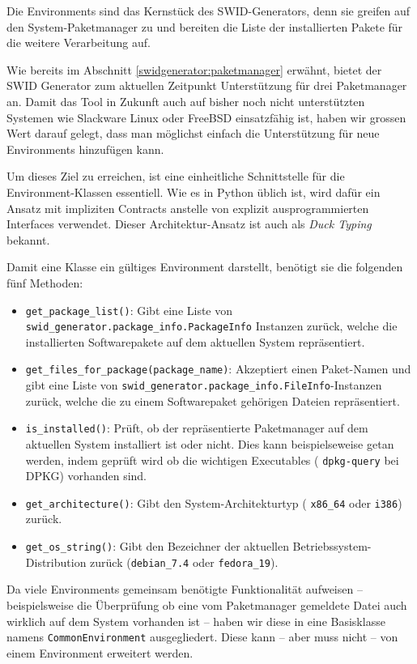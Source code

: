 Die Environments sind das Kernstück des SWID-Generators, denn sie greifen auf
den System-Paketmanager zu und bereiten die Liste der installierten Pakete für
die weitere Verarbeitung auf.

Wie bereits im Abschnitt \ref{swidgenerator:paketmanager} erwähnt, bietet der
SWID Generator zum aktuellen Zeitpunkt Unterstützung für drei Paketmanager an.
Damit das Tool in Zukunft auch auf bisher noch nicht unterstützten Systemen wie
Slackware Linux oder FreeBSD einsatzfähig ist, haben wir grossen Wert darauf
gelegt, dass man möglichst einfach die Unterstützung für neue Environments
hinzufügen kann.

Um dieses Ziel zu erreichen, ist eine einheitliche Schnittstelle für die
Environment-Klassen essentiell. Wie es in Python üblich
ist\cite{contracts:2003}, wird dafür ein Ansatz mit impliziten Contracts
anstelle von explizit ausprogrammierten Interfaces verwendet. Dieser
Architektur-Ansatz ist auch als \textit{Duck Typing} bekannt.

Damit eine Klasse ein gültiges Environment darstellt, benötigt sie die folgenden
fünf Methoden:

\begin{itemize}
	\item \texttt{get\_package\_list()}: Gibt eine Liste von
		\texttt{swid\_generator.\-package\_info.\-PackageInfo} Instanzen zurück,
		welche die installierten Softwarepakete auf dem aktuellen System
		repräsentiert.
	\item \texttt{get\_files\_for\_package(package\_name)}: Akzeptiert einen
		Paket-Namen und gibt eine Liste von
		\texttt{swid\_generator.\-package\_info.\-FileInfo}-Instanzen zurück, welche
		die zu einem Softwarepaket gehörigen Dateien repräsentiert.
	\item \texttt{is\_installed()}: Prüft, ob der repräsentierte Paketmanager auf
		dem aktuellen System installiert ist oder nicht. Dies kann beispielseweise
		getan werden, indem geprüft wird ob die wichtigen Executables (\zb
		\texttt{dpkg-query} bei DPKG) vorhanden sind.
	\item \texttt{get\_architecture()}: Gibt den System-Architekturtyp (\zb
		\texttt{x86\_64} oder \texttt{i386}) zurück.
	\item \texttt{get\_os\_string()}: Gibt den Bezeichner der aktuellen
		Betriebssystem-Distribution zurück (\zb \texttt{debian\_7.4} oder
		\texttt{fedora\_19}).
\end{itemize}

Da viele Environments gemeinsam benötigte Funktionalität aufweisen --
beispielsweise die Überprüfung ob eine vom Paketmanager gemeldete Datei auch
wirklich auf dem System vorhanden ist -- haben wir diese in eine Basisklasse
namens \texttt{CommonEnvironment} ausgegliedert. Diese kann -- aber muss nicht
-- von einem Environment erweitert werden.

